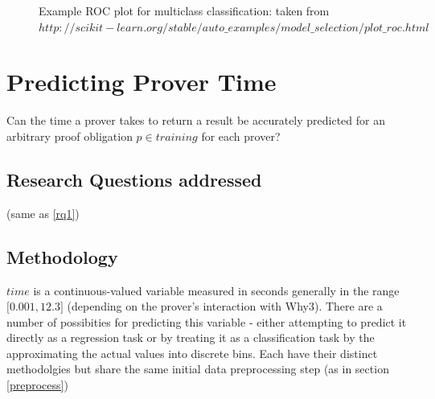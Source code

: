 \documentclass[]{article}
\begin{document}
\begin{figure}[h!]
	\caption{Example ROC plot for multiclass classification: taken from $http://scikit-learn.org/stable/auto\_examples/model\_selection/plot\_roc.html$}
	\label{fig:roc}
\end{figure}

\section{Predicting Prover Time}

Can the time a prover takes to return a result be accurately predicted for an arbitrary proof obligation $p \in training$ for each prover?

\subsection{Research Questions addressed}
(same as \ref{rq1})

\subsection{Methodology}

$time$ is a continuous-valued variable measured in seconds generally in the range $\lbrack 0.001, 12.3 \rbrack$ (depending on the prover's interaction with Why3). There are a number of possibities for predicting this variable - either attempting to predict it directly as a regression task or by treating it as a classification task by the approximating the actual values into discrete bins. Each have their distinct methodolgies but share the same initial data preprocessing step (as in section \ref{preprocess})
\end{document}
